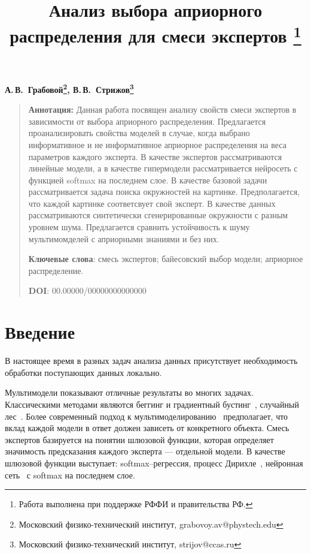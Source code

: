 \documentclass[12pt, twoside]{article}
\numberwithin{equation}{section}
\begin{document}
\title{\bf Анализ выбора априорного распределения для смеси экспертов \thanks{Работа выполнена при поддержке РФФИ и правительства РФ.}}
\date{}
\author{}
\maketitle

\begin{center}
\bf
А.\,В.~Грабовой\footnote{Московский физико-технический институт, grabovoy.av@phystech.edu}, В.\,В.~Стрижов\footnote{Московский физико-технический институт, strijov@ccas.ru}

\end{center}

{\centering\begin{quote}
\textbf{Аннотация:} 
Данная работа посвящен анализу свойств смеси экспертов в зависимости от выбора априорного распределения. Предлагается проанализировать свойства моделей в случае, когда выбрано информативное и не информативное априорное распределения на веса параметров каждого эксперта. В качестве экспертов рассматриваются линейные модели, а в качестве гипермодели рассматривается нейросеть с функцией softmax на последнем слое. В качестве базовой задачи рассматривается задача поиска окружностей на картинке. Предполагается, что каждой картинке соответсвует свой эксперт. В качестве данных рассматриваются синтетически сгенерированные окружности с разным уровнем шума. Предлагается сравнить устойчивость к шуму мультимомделей с априорными знаниями и без них.

\smallskip
\textbf{Ключевые слова}: смесь экспертов; байесовский выбор модели; априорное распределение.

\smallskip
\textbf{DOI}: 00.00000/00000000000000
\end{quote}
}

\section{Введение}
В настоящее время в разных задач анализа данных присутствует необходимость обработки поступающих данных локально. 

Мультимодели показывают отличные результаты во многих задачах. Классическими методами являются беггинг и градиентный бустинг~\cite{Tianqi2016}, случайный лес~\cite{Ishwaran2012}. Более современный подход к мультимоделированию~\cite{Yuksel2012} предполагает, что вклад каждой модели в ответ должен зависеть от конкретного объекта. Смесь экспертов базируется на понятии шлюзовой функции, которая определяет значимость предсказания каждого эксперта --- отдельной модели. В качестве шлюзовой функции выступает: softmax--регрессия, процесс Дирихле~\cite{Edward2002}, нейронная сеть~\cite{Shazeer2017} с softmax на последнем слое.
\end{document}
